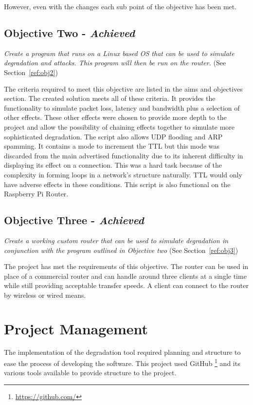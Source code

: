 However, even with the changes each sub point of the objective has been met.

\subsection{Objective Two - {\it Achieved}}
{\it Create a program that runs on a Linux based OS that can be used to simulate degradation and attacks. This program will then be run on the router.} (See Section~\ref{ref:obj2})

The criteria required to meet this objective are listed in the aims and objectives section. The created solution meets all of these criteria. It provides the functionality to simulate packet loss, latency and bandwidth plus a selection of other effects. These other effects were chosen to provide more depth to the project and allow the possibility of  chaining effects together to simulate more sophisticated degradation. The script also allows UDP flooding and ARP spamming. It contains a mode to increment the TTL but this mode was discarded from the main advertised functionality due to its inherent difficulty in displaying its effect on a connection. This was a hard task because of the complexity in forming loops in a network's structure naturally. TTL would only have adverse effects in these conditions. This script is also functional on the Raspberry Pi Router.


\subsection{Objective Three - {\it Achieved}}
{\it Create a working custom router that can be used to simulate degradation in conjunction with the program outlined in Objective two} (See Section~\ref{ref:obj3})

The project has met the requirements of this objective. The router can be used in place of a commercial router and can handle around three clients at a single time while still providing acceptable transfer speeds. A client can connect to the router by wireless or wired means.

\section{Project Management}
The implementation of the degradation tool required planning and structure to ease the process of developing the software. This project used GitHub \footnote{\url{https://github.com/}} and its various tools available to provide structure to the project.

